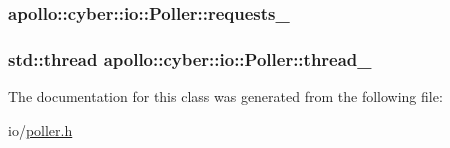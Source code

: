 \hypertarget{classapollo_1_1cyber_1_1io_1_1Poller_a23832294a91e3659fd279314aa351612}{
\subsubsection[{requests\-\_\-}]{ apollo\-::cyber\-::io\-::\-Poller\-::requests\-\_\-\hspace{0.3cm}{\ttfamily [private]}}}\label{classapollo_1_1cyber_1_1io_1_1Poller_a23832294a91e3659fd279314aa351612}
\hypertarget{classapollo_1_1cyber_1_1io_1_1Poller_a2145143a3849794f4faf3aa7c5c0b841}{
\subsubsection[{thread\-\_\-}]{\setlength{\rightskip}{0pt plus 5cm}std\-::thread apollo\-::cyber\-::io\-::\-Poller\-::thread\-\_\-\hspace{0.3cm}{\ttfamily [private]}}}\label{classapollo_1_1cyber_1_1io_1_1Poller_a2145143a3849794f4faf3aa7c5c0b841}


The documentation for this class was generated from the following file\-:\begin{DoxyCompactItemize}
\item 
io/\hyperlink{poller_8h}{poller.\-h}\end{DoxyCompactItemize}
